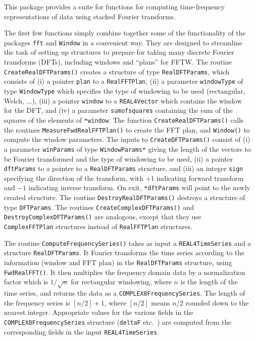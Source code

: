 \documentclass{article}
\begin{document}
This package provides a suite for functions for computing 
time-frequency representations of data using stacked Fourier
transforms.


The first few functions simply combine together some of the
functionality of the packages \verb+fft+ and \verb+Window+ in a
convenient way.  They are designed to streamline the task of setting
up structures to prepare for taking many discrete Fourier transforms
(DFTs), including windows and ``plans'' for FFTW.
The routine \verb+CreateRealDFTParams()+ creates a structure of type
\verb+RealDFTParams+, which 
consists of (i) a pointer \verb+plan+ to a
\verb+RealFFTPlan+, (ii) a parameter \verb+windowType+ of type
\verb+WindowType+ which specifies the type of windowing to be used
(rectangular, Welch, ...),  (iii) a pointer
\verb+window+ to a \verb+REAL4Vector+ which contains the window for
the DFT, and (iv) a parameter \verb+sumofsquares+ containing the sum
of the squares of the elements of \verb+*window+.  The function
\verb+CreateRealDFTParams()+ calls the routines
\verb+MeasureFwdRealFFTPlan()+ to create the FFT plan, and
\verb+Window()+ to compute the window parameters.  
The inputs to \verb+CreateDFTParams()+ consist of (i) a
parameter \verb+winParams+ of type \verb+WindowParams*+ giving the
length of the vectors to be Fourier  
transformed and the type of windowing to be used, (ii) a pointer
\verb+dftParams+ to a pointer to a \verb+RealDFTParams+ 
structure, and (iii) an integer \verb+sign+ specifying the direction
of the transform, with $+1$ indicating forward transform and $-1$
indicating inverse transform.  On exit, \verb+*dftParams+ will point
to the newly created 
structure.  The routine \verb+DestroyRealDFTParams()+ destroys a structure
of type \verb+DFTParams+. 
The routines \verb+CreateComplexDFTParams()+ and
\verb+DestroyComplexDFTParams()+ are analogous, except that they use
\verb+ComplexFFTPlan+ structures instead of \verb+RealFFTPlan+ structures.




The routine \verb+ComputeFrequencySeries()+ takes as input a
\verb+REAL4TimeSeries+ and a structure \verb+RealDFTParams+.  It Fourier
transforms the time series according to the information (window and
FFT plan) in the \verb+RealDFTParams+ structure, using
\verb+FwdRealFFT()+.  It then 
multiplies the frequency domain data by a normalization
factor which is $1/\sqrt{n}$ for rectangular windowing, 
where $n$ is the length of the time series,
and returns the data as a \verb+COMPLEX8FrequencySeries+.
The length of the frequency
series is $[n/2]+1$, where $[n/2]$ means $n/2$ rounded down to the
nearest integer.  Appropriate values for the various fields in the
\verb+COMPLEX8FrequencySeries+ structure (\verb+deltaF+ etc.~) are
computed from the corresponding fields in the input
\verb+REAL4TimeSeries+. 
\end{document}
